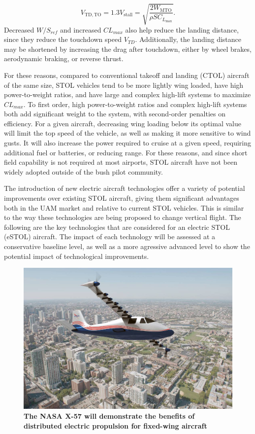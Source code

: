 \documentclass[]{aiaa-tc}%
\begin{document}
\begin{equation}
    \label{e:stall}
    V_{\mathrm{TD,TO}} = 1.3V_{\mathrm{stall}} = \sqrt{\frac{2W_{\mathrm{MTO}}}{\rho S C_{L_{\mathrm{max}}}}}.
\end{equation}
Decreased $W/S_{ref}$ and increased $CL_{max}$ also help reduce the landing distance, since they reduce the touchdown speed $V_{TD}$.  Additionally, the landing distance may be shortened by increasing the drag after touchdown, either by wheel brakes, aerodynamic braking, or reverse thrust.  

For these reasons, compared to conventional takeoff and landing (CTOL) aircraft of the same size, STOL vehicles tend to be more lightly wing loaded, have high power-to-weight ratios, and have large and complex high-lift systems to maximize $CL_{max}$.  To first order, high power-to-weight ratios and complex high-lift systems both add significant weight to the system, with second-order penalties on efficiency.  For a given aircraft, decreasing wing loading below its optimal value will limit the top speed of the vehicle, as well as making it more sensitive to wind gusts.  It will also increase the power required to cruise at a given speed, requiring additional fuel or batteries, or reducing range.  For these reasons, and since short field capability is not required at most airports, STOL aircraft have not been widely adopted outside of the bush pilot community. 

The introduction of new electric aircraft technologies offer a variety of potential improvements over existing STOL aircraft, giving them significant advantages both in the UAM market and relative to current STOL vehicles.  This is similar to the way these technologies are being proposed to change vertical flight.  The following are the key technologies that are considered for an electric STOL (eSTOL) aircraft.  The impact of each technology will be assessed at a conservative baseline level, as well as a more agressive advanced level to show the potential impact of technological improvements.  
\begin{figure}
	\begin{center}
	\includegraphics{x-57.jpg}
    \caption{\textbf{The NASA X-57 will demonstrate the benefits of distributed electric propulsion for fixed-wing aircraft \cite{NASAWeb}}}
	\label{f:x57}
	\end{center}
\end{figure}
\end{document}
